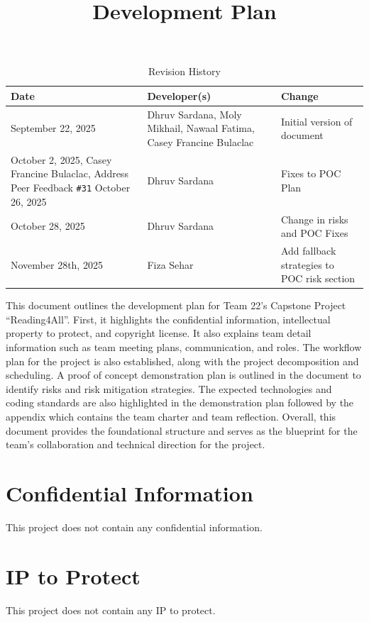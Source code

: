 \documentclass{article}
\title{Development Plan\\\progname}
\author{\authname}
\date{}
\begin{document}
\maketitle

\begin{table}[hp]
\caption{Revision History} \label{TblRevisionHistory}
\begin{tabularx}{\textwidth}{l>{\raggedright\arraybackslash}p{4cm}X}
\toprule
\textbf{Date} & \textbf{Developer(s)} & \textbf{Change}\\
\midrule
September 22, 2025 & Dhruv Sardana, Moly Mikhail, Nawaal Fatima, Casey Francine Bulaclac & Initial version of document\\
October 2, 2025, Casey Francine Bulaclac, Address Peer Feedback \texttt{\#31}
October 26, 2025 & Dhruv Sardana & Fixes to POC Plan\\
October 28, 2025 & Dhruv Sardana & Change in risks and POC Fixes\\
November 28th, 2025 & Fiza Sehar & Add fallback strategies to POC risk section \\ 
\bottomrule
\end{tabularx}
\end{table}

\newpage{}

This document outlines the development plan for Team 22's Capstone Project ``Reading4All''. First, it highlights the confidential information, intellectual property to protect, and copyright 
license. It also explains team detail information such as team meeting plans, communication,
and roles. The workflow plan for the project is also established, along with the project 
decomposition and scheduling. A proof of concept demonstration plan is outlined in the document to 
identify risks and risk mitigation strategies. The expected technologies and coding standards are 
also highlighted in the demonstration plan followed by the appendix which contains the 
team charter and team reflection. Overall, this document provides the foundational structure 
and serves as the blueprint for the team's collaboration and technical direction for the project.

\section{Confidential Information}

This project does not contain any confidential information.


\section{IP to Protect}
This project does not contain any IP to protect. 
\end{document}
